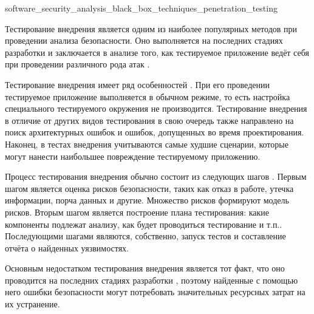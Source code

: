 
	{software_security_analysis_black_box_techniques_penetration_testing}

%
Тестирование внедрения является одним из наиболее популярных методов при проведении анализа безопасности. 
%
Оно выполняется на последних стадиях разработки  и заключается в анализе того, как тестируемое приложение ведёт себя при проведении различного рода атак .

%
Тестирование внедрения имеет ряд особенностей . 
%
При его проведении тестируемое приложение выполняется в обычном режиме, то есть настройка специального тестируемого окружения не производится. 
%
Тестирование внедрения в отличие от других видов тестирования в свою очередь также направлено на поиск архитектурных ошибок и ошибок, допущенных во время проектирования. 
%
Наконец, в тестах внедрения учитываются самые худшие сценарии, которые могут нанести наибольшее повреждение тестируемому приложению.

%
Процесс тестирования внедрения обычно состоит из следующих шагов . 
%
Первым шагом является оценка рисков безопасности, таких как отказ в работе, утечка информации, порча данных и другие. 
%
Множество рисков формируют модель рисков. 
%
Вторым шагом является построение плана тестирования: какие компоненты подлежат анализу, как будет проводиться тестирование и т.п.. 
%
Последующими шагами являются, собственно, запуск тестов и составление отчёта о найденных уязвимостях.

%
Основным недостатком тестирования внедрения является тот факт, что оно проводится на последних стадиях разработки , поэтому найденные с помощью него ошибки безопасности могут потребовать значительных ресурсных затрат на их устранение.